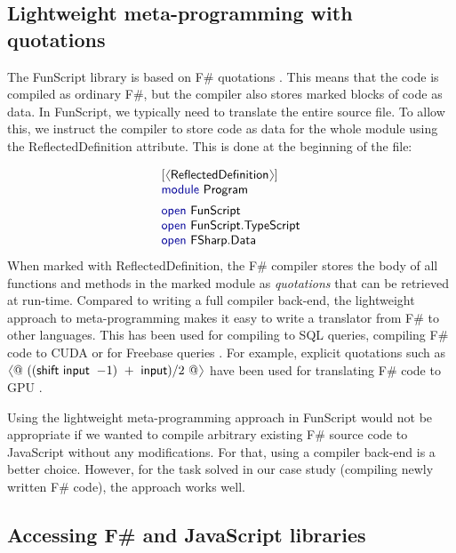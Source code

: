 \documentclass[submission,copyright,creativecommons]{eptcs}
\newcommand{\langl}{\begin{picture}(4.5,7)
\put(1.1,2.5){\rotatebox{60}{\line(1,0){5.5}}}
\put(1.1,2.5){\rotatebox{300}{\line(1,0){5.5}}}
\end{picture}}
\newcommand{\rangl}{\begin{picture}(4.5,7)
\put(.9,2.5){\rotatebox{120}{\line(1,0){5.5}}}
\put(.9,2.5){\rotatebox{240}{\line(1,0){5.5}}}
\end{picture}}
\newcommand{\kvd}[1]{\textnormal{\textcolor{kvdclr}{\sffamily #1}}}
\newcommand{\ident}[1]{\textnormal{\sffamily #1}}
\begin{document}
\subsection{Lightweight meta-programming with quotations}
\label{sec:js-meta}

The FunScript library is based on F\# quotations \cite{fsharp-metaprog}. This means that the code
is compiled as ordinary F\#, but the compiler also stores marked blocks of code as data.
In FunScript, we typically need to translate the entire source file. To allow this, we instruct the
compiler to store code as data for the whole module using the \ident{ReflectedDefinition} attribute.
This is done at the beginning of the file:

\begin{equation*}
\begin{array}{l}
 \lbrack\langl\ident{ReflectedDefinition}\rangl\rbrack \\
 \kvd{module}~\ident{Program}
 \\[0.5em]
 \kvd{open}~\ident{FunScript} \\
 \kvd{open}~\ident{FunScript.TypeScript} \\
 \kvd{open}~\ident{FSharp.Data}
\end{array}
\end{equation*}
%
When marked with \ident{ReflectedDefinition}, the F\# compiler stores the body of all functions and
methods in the marked module as \emph{quotations} that can be retrieved at run-time.
Compared to writing a full compiler back-end, the lightweight approach to meta-programming makes it easy to
write a translator from F\# to other languages. This has been used for compiling to SQL queries, compiling
F\# code to CUDA or for Freebase queries \cite{fsharp-data}. For example, explicit quotations such as
$\langl @~ ((\ident{shift input}~-\hspace{-0.2em}1) ~+~ \ident{input})/2 ~@\rangl$
have been used for translating F\# code to GPU \cite{accelerator}.

Using the lightweight meta-programming approach in FunScript would not be appropriate if we wanted to
compile arbitrary existing F\# source code to JavaScript without any modifications. For that, using a
compiler back-end is a better choice. However, for the task solved in our case study (compiling
newly written F\# code), the approach works well.

\subsection{Accessing F\# and JavaScript libraries}
\label{sec:js-lib}
\end{document}
